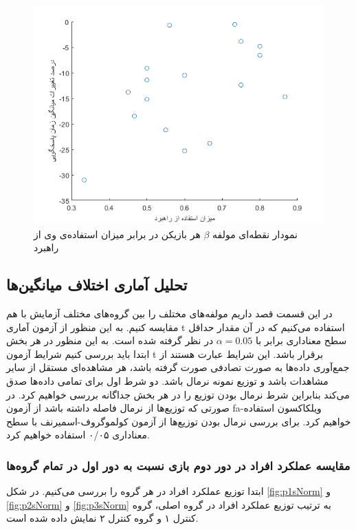 \documentclass[twoside, a4paper,11pt]{book}
\numberwithin{equation}{chapter}
\numberwithin{table}{chapter}
\numberwithin{figure}{chapter}
\numberwithin{equation}{chapter}
\newcommand{\mls}[1]{\gls{fa-#1}\glsuseri{la-#1}}
\begin{document}
\begin{figure}
\centering
\includegraphics[scale=0.8]{Figures/stUseDtScatter.png}
\caption{\label{fig:stUseDtScatter}
نمودار نقطه‌ای مولفه $\beta$ هر بازیکن در برابر میزان استفاده‌ی وی از راهبرد
}
\end{figure}



\subsection{تحلیل آماری اختلاف میانگین‌ها}
در این قسمت قصد داریم مولفه‌های مختلف را بین گروه‌های مختلف آزمایش با هم مقایسه کنیم. به این منظور از آزمون آماری t  استفاده می‌کنیم که در آن مقدار حداقل سطح معناداری برابر با  $\alpha = 0.05$ در نظر گرفته شده است. به این منظور در هر بخش ابتدا باید بررسی کنیم شرایط آزمون t برقرار باشد. این شرایط عبارت هستند از جمع‌آوری داده‌ها به صورت تصادفی صورت گرفته باشد، هر مشاهده‌ای مستقل از سایر مشاهدات باشد و توزیع نمونه نرمال باشد. دو شرط اول برای تمامی داده‌ها صدق می‌کند بنابراین شرط نرمال بودن توزیع را در هر بخش جداگانه بررسی خواهیم کرد. در صورتی که توزیع‌ها از نرمال فاصله داشته باشد از آزمون \mls{ویلکاکسون} استفاده خواهیم کرد. برای بررسی نرمال بودن توزیع‌ها از آزمون کولموگروف-اسمیرنف با سطح معناداری ۰/۰۵ استفاده خواهیم کرد.

\subsubsection{مقایسه عملکرد افراد در دور دوم بازی نسبت به دور اول در تمام گروه‌ها}

ابتدا توزیع عملکرد افراد در هر گروه را بررسی می‌کنیم. در شکل \ref{fig:p1sNorm} و \ref{fig:p2sNorm} و \ref{fig:p3sNorm} به ترتیب توزیع عملکرد افراد در گروه اصلی، گروه کنترل ۱ و گروه کنترل ۲ نمایش داده شده است.
\end{document}
